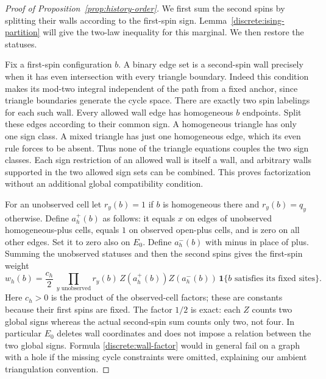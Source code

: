 \documentclass[11pt]{article}
\newcommand{\ind}{\mathbf 1}
\theoremstyle{definition}
\theoremstyle{remark}
\numberwithin{equation}{section}
\begin{document}
\begin{proof}[Proof of Proposition~\ref{prop:history-order}]
We first sum the second spins by splitting their walls according to the
first-spin sign.  Lemma~\ref{discrete:ising-partition} will give the
two-law inequality for this marginal.  We then restore the statuses.

Fix a first-spin configuration $b$. A binary edge set is a second-spin
wall precisely when it has even intersection with every triangle boundary.
Indeed this condition makes its mod-two integral independent of the path
from a fixed anchor, since triangle boundaries generate the cycle space.
There are exactly two spin labelings for each such wall. Every allowed wall
edge has homogeneous $b$ endpoints. Split these edges according to their
common sign. A homogeneous triangle has only one sign class. A mixed
triangle has just one homogeneous edge, which its even rule forces to be
absent. Thus none of the triangle equations couples the two sign classes.
Each sign restriction of an allowed wall is itself a wall, and arbitrary
walls supported in the two allowed sign sets can be combined. This proves
factorization without an additional global compatibility condition.

For an unobserved cell let
$r_y(b)=1$ if $b$ is homogeneous there and $r_y(b)=q_y$ otherwise.
Define $a_h^+(b)$ as follows: it equals $x$ on edges of unobserved
homogeneous-plus cells, equals $1$ on observed open-plus cells, and is zero
on all other edges. Set it to zero also on $E_0$. Define $a_h^-(b)$ with
minus in place of plus. Summing the unobserved statuses and then the second
spins gives the first-spin weight
\begin{equation}\label{discrete:wall-factor}
 w_h(b)=\frac{c_h}{2}\,
   \prod_{y\text{ unobserved}}r_y(b)\,
   Z(a_h^+(b))Z(a_h^-(b))\,
   \ind\{b\text{ satisfies its fixed sites}\}.
\end{equation}
Here $c_h>0$ is the product of the observed-cell factors; these are
constants because their first spins are fixed. The factor $1/2$ is exact:
each $Z$ counts two global signs whereas the actual second-spin sum counts
only two, not four. In particular $E_0$ deletes wall coordinates and does
not impose a relation between the two global signs. Formula
\eqref{discrete:wall-factor} would in general fail on a graph with a hole
if the missing cycle constraints were omitted, explaining our ambient
triangulation convention.


\end{proof}
\end{document}
